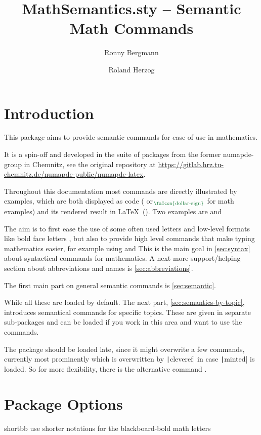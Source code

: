 \documentclass[english,a4paper,DIV=12,parskip=full,oneside]{scrartcl}
\date{\ISOToday}
\author{Ronny Bergmann \and Roland Herzog}
\title{MathSemantics.sty – Semantic Math Commands}
\begin{document}
    \maketitle
    \tableofcontents
    \section{Introduction}
    This package aims to provide semantic commands for ease of use in mathematics.

    It is a spin-off and developed in the suite of packages from the former numapde-group in Chemnitz,
    see the original repository at \url{https://gitlab.hrz.tu-chemnitz.de/numapde-public/numapde-latex}.

    Throughout this documentation most commands are directly illustrated by examples, which are
    both displayed as code ( or $_{\hspace{-.5ex}\text{\color{TolMutedGreen}\faIcon{dollar-sign}}}$ for math examples) and its rendered result in \LaTeX\ (\faEye[regular]).
    Two examples are \mathCodeExample{\R} and \codeExample{\eg}

    The aim is to first ease the use of some often used letters and low-level formats like
    bold face letters \mathCodeExample{\bbR}, but also to provide high level commands that
    make typing mathematics easier, for example using  and  
    This is the main goal in \cref{sec:syntax} about syntactical commands for mathematics.
    A next more support/helping section about abbreviations and names is \cref{sec:abbreviations}.

    The first main part on general semantic commands is \cref{sec:semantic}.

    While all these are loaded by default. The next part, \cref{sec:semantics-by-topic},
    introduces semantical commands for specific topics.
    These are given in separate sub-packages and can be loaded if you work in this area and want to use the commands.

    The package should be loaded late, since it might overwrite a few commands,
    currently most prominently \codeCommand{\d} which is overwritten by \texttt|cleveref| in case \texttt|minted| is loaded.
    So for more flexibility, there is the alternative command \codeCommand{\dInt}.



    \section{Package Options}
        \label{sec:package-options}
        \begin{commandlist}
            \item[shortbb] use shorter notations for the blackboard-bold math letters \codeCommand{\C, \K, \N, \Q, \R, \Z}
        \end{commandlist}
\end{document}
